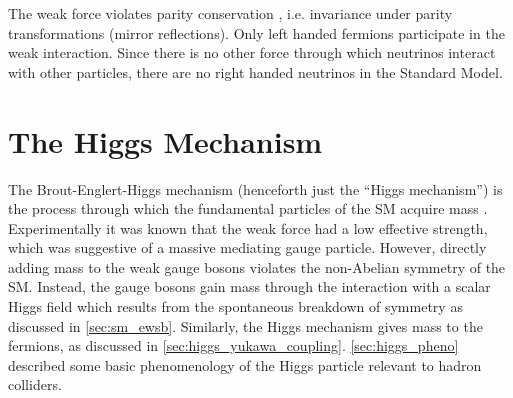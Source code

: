The weak force violates parity conservation \cite{PhysRev.104.254,PhysRev.105.1413,PhysRev.105.1415}, i.e. invariance under parity transformations (mirror reflections).
Only left handed fermions participate in the weak interaction.
Since there is no other force through which neutrinos interact with other particles, there are no right handed neutrinos in the Standard Model.






\section{The Higgs Mechanism}\label{sec:sm_higgs}

The Brout-Englert-Higgs mechanism (henceforth just the ``Higgs mechanism'') is the process through which the fundamental particles of the SM acquire mass \cite{Englert:1964et,Higgs:1964pj,Guralnik:1964eu}.
Experimentally it was known that the weak force had a low effective strength, which was suggestive of a massive mediating gauge particle.
However, directly adding mass to the weak gauge bosons violates the non-Abelian symmetry of the SM.
Instead, the gauge bosons gain mass through the interaction with a scalar Higgs field which results from the spontaneous breakdown of symmetry as discussed in \cref{sec:sm_ewsb}.
Similarly, the Higgs mechanism gives mass to the fermions, as discussed in \cref{sec:higgs_yukawa_coupling}.
\cref{sec:higgs_pheno} described some basic phenomenology of the Higgs particle relevant to hadron colliders.


